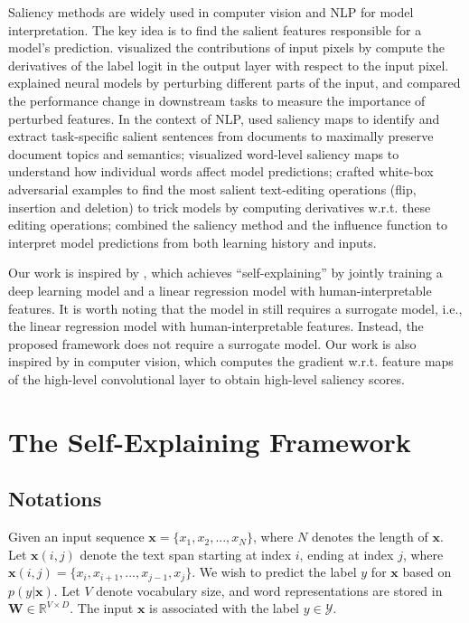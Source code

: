 \documentclass[11pt,a4paper]{article}
\begin{document}
Saliency methods are widely used in  computer vision \citep{simonyan2013deep,zeiler2014visualizing,springenberg2014striving,adler2018auditing,datta2016algorithmic,srinivas2019full} and NLP \cite{denil2015extraction,li2015visualizing,li2016understanding,arras2016explaining,ebrahimi2017hotflip,feng2018pathologies,meng2020pair} for model interpretation. 
The key idea is to 
 find the  salient features responsible for a model's prediction.
 \citet{simonyan2013deep,srinivas2019full} visualized the contributions of input pixels by compute the derivatives of the label logit in the output layer with respect to the input pixel. 
 \citet{adler2018auditing,datta2016algorithmic} explained neural models by perturbing different  parts of the input, and compared the performance change in downstream tasks to measure the importance of perturbed features.
In the context of NLP,  \citet{denil2015extraction} used saliency maps to identify and extract task-specific salient sentences from documents to maximally preserve document topics and semantics; 
\citet{li2015visualizing} visualized word-level saliency maps to understand how individual words affect model predictions; \citet{ebrahimi2017hotflip} crafted white-box adversarial examples 
to find the most salient text-editing operations (flip, insertion and deletion) to trick models
by computing derivatives w.r.t. these editing operations; \citet{meng2020pair} combined the saliency method and the influence function \citep{koh2017understanding} to interpret model predictions from both learning history and inputs. 

 
  
Our work is inspired by , which achieves  ``self-explaining'' by jointly training a deep learning model and a linear regression model with human-interpretable features.
It is worth noting that the model in  still requires a surrogate model, i.e., the  linear regression model with human-interpretable features. 
Instead, the proposed framework does not require a surrogate model. 
Our work is also inspired by  in computer vision, 
which 
computes the gradient  w.r.t.  feature maps of the high-level convolutional
layer to obtain high-level saliency scores. 

\section{The Self-Explaining Framework}
\subsection{Notations}
Given an input sequence $\bm{x} = \{x_1, x_2, ..., x_N\}$, where $N$ denotes the length of $\bm{x}$. 
Let $\bm{x}(i,j)$ denote the text span starting at index $i$, ending at index $j$, where
$\bm{x}(i,j) = \{x_i, x_{i+1},..., x_{j-1}, x_j\}$. 
We wish to predict the label $y$ for $\bm{x}$ based on $p(y|\bm{x})$.
Let $V$ denote vocabulary size, and word representations are stored in $\bm{W}\in\mathbb{R}^{ V\times D}$.
The input $\bm{x}$ is associated with the label $y\in \mathcal{Y}$. 
\end{document}
